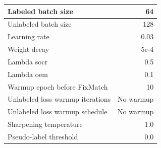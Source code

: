 \begin{tabular}{L{\WWW}  R{\RRR}}
\\ \hline
Labeled batch size & 64
\\ \hline
Unlabeled batch size & 128
\\ \hline
Learning rate & 0.03
\\ \hline
Weight decay & 5e-4
\\ \hline
Lambda socr & 0.5
\\ \hline
Lambda oem & 0.1
\\ \hline
Warmup epoch before FixMatch & 10
\\ \hline
Unlabeled loss warmup iterations & No warmup
\\ \hline
Unlabeled loss warmup schedule & No warmup
\\ \hline
Sharpening temperature & 1.0
\\ \hline
Pseudo-label threshold & 0.0
\end{tabular}